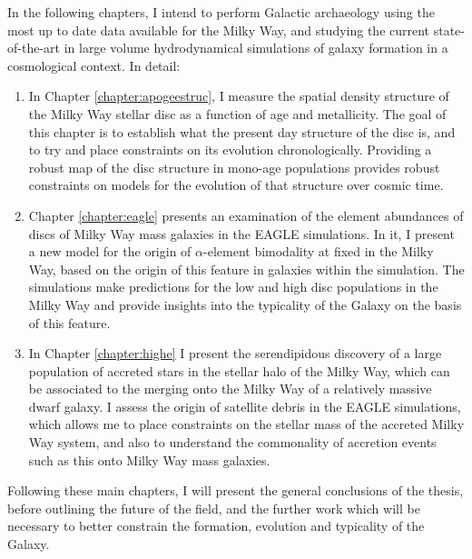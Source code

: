 In the following chapters, I intend to perform Galactic archaeology using the most up to date data available for the Milky Way, and studying the current state-of-the-art in large volume hydrodynamical simulations of galaxy formation in a cosmological context. In detail:
\begin{enumerate}
    \item In Chapter \ref{chapter:apogeestruc}, I measure the spatial density structure of the Milky Way stellar disc as a function of age and metallicity. The goal of this chapter is to establish what the present day structure of the disc is, and to try and place constraints on its evolution chronologically. Providing a robust map of the disc structure in mono-age populations provides robust constraints on models for the evolution of that structure over cosmic time.
    \item Chapter \ref{chapter:eagle} presents an examination of the element abundances of discs of Milky Way mass galaxies in the EAGLE simulations. In it, I present a new model for the origin of $\alpha$-element bimodality at fixed \feh{} in the Milky Way, based on the origin of this feature in galaxies within the simulation. The simulations make predictions for the low and high \afe{} disc populations in the Milky Way and provide insights into the typicality of the Galaxy on the basis of this feature.
    \item In Chapter \ref{chapter:highe} I present the serendipidous discovery of a large population of accreted stars in the stellar halo of the Milky Way, which can be associated to the merging onto the Milky Way of a relatively massive dwarf galaxy. I assess the origin of satellite debris in the EAGLE simulations, which allows me to place constraints on the stellar mass of the accreted Milky Way system, and also to understand the commonality of accretion events such as this onto Milky Way mass galaxies.
\end{enumerate}
Following these main chapters, I will present the general conclusions of the thesis, before outlining the future of the field, and the further work which will be necessary to better constrain the formation, evolution and typicality of the Galaxy.




